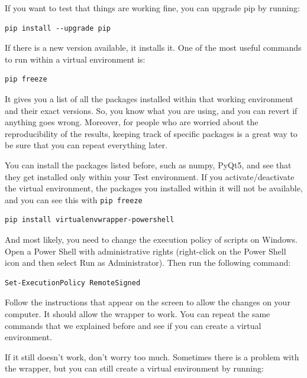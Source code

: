 If you want to test that things are working fine, you can upgrade pip by running:

\begin{verbatim}
pip install --upgrade pip
\end{verbatim}

If there is a new version available, it installs it. One of the most useful commands to run within a virtual environment is:

\begin{verbatim}
pip freeze
\end{verbatim}

It gives you a list of all the packages installed within that working environment and their exact versions. So, you know what you are using, and you can revert if anything goes wrong. Moreover, for people who are worried about the reproducibility of the results, keeping track of specific packages is a great way to be sure that you can repeat everything later.

You can install the packages listed before, such as numpy, PyQt5,  and see that they get installed only within your Test environment. If you activate/deactivate the virtual environment, the packages you installed within it will not be available, and you can see this with \texttt{pip freeze}


\begin{verbatim}
pip install virtualenvwrapper-powershell
\end{verbatim}

And most likely, you need to change the execution policy of scripts on Windows. Open a Power Shell with administrative rights (right-click on the Power Shell icon and then select Run as Administrator). Then run the following command:

\begin{verbatim}
Set-ExecutionPolicy RemoteSigned
\end{verbatim}

Follow the instructions that appear on the screen to allow the changes on your computer. It should allow the wrapper to work. You can repeat the same commands that we explained before and see if you can create a virtual environment.

If it still doesn't work, don't worry too much. Sometimes there is a problem with the wrapper, but you can still create a virtual environment by running:

